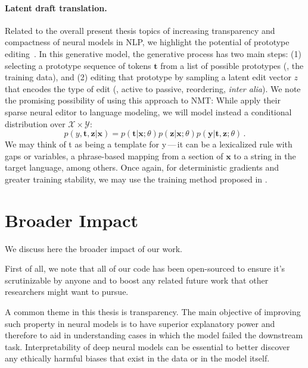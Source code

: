 \paragraph*{Latent draft translation.} Related to the overall present
thesis topics of increasing transparency and compactness of neural
models in NLP, we highlight the potential of prototype
editing~\citep{guu2018GeneratingSentencesEditing,
    he2020LearningSparsePrototypes}. In this generative model, the
generative process has two main steps: (1) selecting a prototype
sequence of tokens $\bm{t}$ from a list of possible prototypes (\eg,
the training data), and (2) editing that prototype by sampling a latent
edit vector $z$ that encodes the type of edit (\eg, active to passive,
reordering, \textit{inter alia}). We note the promising possibility
of using this approach to NMT: While \citep{he2020LearningSparsePrototypes} apply their
sparse neural editor to language modeling, we will model instead a
conditional distribution over $\mathcal{X} \times \mathcal{Y}$:
%
\begin{equation}
    p(y, \bm{t}, \bm{z} | \bm{x}) =
    p(\bm{t} | \bm{x}; \theta)
    p(\bm{z} | \bm{x}; \theta)
    p(\bm{y} | \bm{t}, \bm{z}; \theta)\,.
\end{equation}
%
We may think of t as being a template for y\,---\,it can be a
lexicalized rule with gaps or variables, a phrase-based mapping
from a section of $\bm x$ to a string in the target language, among others.
Once again, for deterministic gradients and greater training stability, we
may use the training method proposed in .

\section{Broader Impact}\label{sec:impact}

\noindent We discuss here the broader impact of our work.

First of all, we note that all of our code has been
open-sourced to ensure it's scrutinizable by
anyone and to boost any related future work that other researchers
might want to pursue.

A common theme in this thesis is transparency.
The main objective of improving such property in neural models
is to have superior explanatory power and therefore to aid in understanding cases
in which the model failed the downstream task. Interpretability of
deep neural models can be essential to better discover any ethically
harmful biases that exist in the data or in the model itself.

